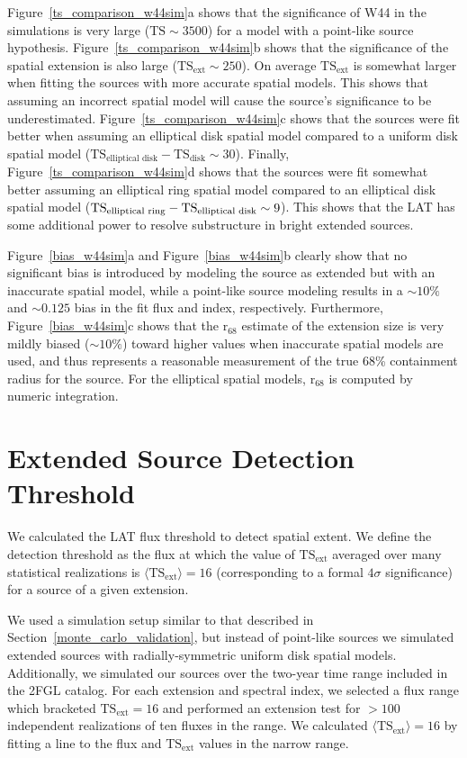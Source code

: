 \documentclass[12pt,preprint]{aastex}
\newcommand{\tsext}{{\ensuremath{\text{TS}_{\text{ext}}}}\xspace}
\newcommand{\rsixeight}{{\ensuremath{\text{r}_{68}}}\xspace}
\newcommand{\ts}{\text{TS}\xspace}
\begin{document}
{Figure~\ref{ts_comparison_w44sim}a 
shows that
the significance of W44 in the simulations is very large ($\ts\sim3500$) 
for a model with a point-like source hypothesis.
Figure~\ref{ts_comparison_w44sim}b shows that 
the significance of the spatial extension is also large
($\tsext\sim250$).  
On average \tsext is somewhat larger when fitting
the sources with more accurate spatial models.  This shows that
assuming an incorrect spatial model will cause the source's
significance to be underestimated.  Figure~\ref{ts_comparison_w44sim}c
shows that the sources were fit better when assuming an elliptical
disk spatial model compared to a uniform disk spatial model
($\ts_\text{elliptical\ disk}-\ts_\text{disk}\sim30$).  Finally,
Figure~\ref{ts_comparison_w44sim}d shows that the sources were
fit somewhat better assuming an elliptical ring spatial model
compared to an elliptical disk spatial model ($\ts_\text{elliptical\
ring}-\ts_\text{elliptical\ disk}\sim9$). This shows that the LAT has
some additional power to resolve substructure in bright extended sources.


Figure~\ref{bias_w44sim}a and Figure~\ref{bias_w44sim}b clearly show that
no significant bias is introduced by modeling the source as extended
but with an inaccurate spatial model, while a point-like source modeling
results in a $\sim10\%$ and $\sim0.125$ bias in the fit flux and index,
respectively.  
Furthermore, Figure~\ref{bias_w44sim}c shows that the \rsixeight estimate of
the extension size is very mildly biased ($\sim10\%$) toward higher values
when inaccurate spatial models are used, and thus represents a reasonable
measurement of the true 68\% containment radius for the source.
For the elliptical spatial models, \rsixeight is computed by numeric integration.

}

\section{Extended Source Detection Threshold}
\label{extension_sensitivity}

We calculated the LAT flux 
threshold to detect spatial extent. We define the detection threshold as the flux at
which the value of $\tsext$ averaged over many statistical realizations is
$\langle\tsext\rangle=16$ 
(corresponding to a formal $4\sigma$ significance)
for a source of a given extension.

We used a simulation setup similar to that described in
Section~\ref{monte_carlo_validation}, but instead of point-like sources
we simulated extended sources with radially-symmetric uniform disk spatial 
models. Additionally, we simulated our sources over the two-year
time range included in the 2FGL catalog.  For each extension and spectral index,
we selected a flux range which bracketed $\tsext=16$ and performed an
extension test for $>100$ independent realizations of ten fluxes in
the range.  We calculated $\langle\tsext\rangle=16$ by fitting a line
to the flux and $\tsext$ values in the narrow range.
\end{document}
